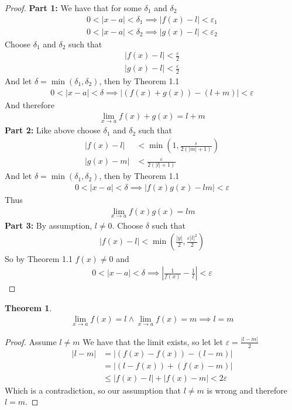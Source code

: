 \documentclass{article}
\theoremstyle{plain}
\newtheorem{theorem}{Theorem}
\theoremstyle{definition}
\begin{document}
\begin{proof}
\textbf{Part 1:} We have that for some $\delta_1$ and $\delta_2$ 
\begin{align*}
    0<|x-a|<\delta_1 \implies |f(x)-l| < \varepsilon_1 \\
    0<|x-a|<\delta_2 \implies |g(x)-l| < \varepsilon_2
\end{align*}
Choose $\delta_1$ and $\delta_2$ such that
\begin{align*}
    |f(x)-l| < \frac{\varepsilon}{2} \\
    |g(x)-l| < \frac{\varepsilon}{2}
\end{align*}
And let $\delta = \min(\delta_1, \delta_2)$, then by Theorem 1.1
\begin{align*}
    0 <|x-a| < \delta \implies |(f(x)+g(x))-(l+m)|< \varepsilon
\end{align*}
And therefore
\begin{align*}
    \lim_{x \rightarrow a} f(x) + g(x) = l + m
\end{align*}
\textbf{Part 2:} Like above choose $\delta_1$ and $\delta_2$ such that
\begin{align*}
    |f(x)-l| &< \min \left(1, \frac{\varepsilon}{2(|m|+1)} \right) \\
    |g(x)-m| &< \frac{\varepsilon}{2(|l|+1)}
\end{align*}
And let $\delta = \min(\delta_1, \delta_2)$, then by Theorem 1.1
\begin{align*}
    0 <|x-a| < \delta \implies |f(x)g(x)-lm|< \varepsilon
\end{align*}
Thus
\begin{align*}
    \lim_{x \rightarrow a} f(x) g(x) = l m
\end{align*}
\textbf{Part 3:} By assumption, $l \neq 0$. Choose $\delta$ such that
\begin{align*}
    |f(x)-l| < \min \left( \frac{|y|}{2}, \frac{\varepsilon|l|^2}{2}\right)
\end{align*}
So by Theorem 1.1 $f(x) \neq 0$ and 
\begin{align*}
    0<|x-a|<\delta \implies \left|\frac{1}{f(x)}-\frac{1}{l}\right| < \varepsilon
\end{align*}
\end{proof}
\begin{theorem}
\begin{align*}
    \lim_{x \rightarrow a} f(x) = l \land \lim_{x \rightarrow a} f(x) = m
    \implies l = m
\end{align*}
\end{theorem}
\begin{proof}
Assume $l \neq m$ We have that the limit exists, so let let $\varepsilon
= \frac{|l-m|}{2}$
\begin{align*}
    |l-m| &= |(f(x)-f(x))-(l-m)| \\
          &= |(l-f(x))+(f(x)-m)| \\
          &\leq |f(x)-l|+|f(x)-m|
          < 2\varepsilon
\end{align*}
Which is a contradiction, so our assumption that $l \neq m$ is wrong
and therefore $l = m$.
\end{proof}
\end{document}
